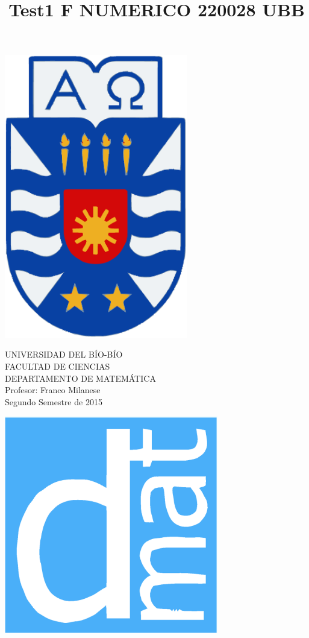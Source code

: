 \documentclass[11pt]{article}
\begin{document}
\title{Test1 F NUMERICO 220028 UBB}

{\begin{minipage}{2cm}
\hspace*{1cm}\includegraphics[width=0.6\textwidth]{escubo-ubb.eps}
\end{minipage}
\begin{minipage}{12cm}
\small
{\bf \rm 
{
\begin{center}
{\footnotesize UNIVERSIDAD DEL B\'IO-B\'IO} \\
{\scriptsize FACULTAD DE CIENCIAS}  \\
{\scriptsize DEPARTAMENTO DE MATEM\'ATICA}  \\
{\scriptsize Profesor:  Franco Milanese}\\
{\scriptsize Segundo Semestre de 2015}
\end{center}
}}
\end{minipage}}
{\begin{minipage}{2cm}
\hspace*{-0.5cm}\vspace*{-0.05cm}\includegraphics[width=0.7\textwidth]{escudo-dmat.eps}
\end{minipage}}
\end{document}
